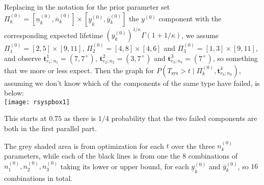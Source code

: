 \documentclass[12pt,a4paper,fleqn]{narms}
\newcommand{\mbf}[1]{\mathbf{#1}}
\newcommand{\uz}{^{(0)}} %
\newcommand{\ul}[1]{\underline{#1}}
\newcommand{\ol}[1]{\overline{#1}}
\def\Tsys{T_\text{sys}}
\def\yz{y\uz}
\def\ykz{y\uz_k}
\def\ykzl{\ul{y}\uz_k}
\def\ykzu{\ol{y}\uz_k}
\def\nkz{n\uz_k}
\newcommand{\nkzfun}[1]{n\uz_{#1}}
\def\nkzl{\ul{n}\uz_k}
\def\nkzu{\ol{n}\uz_k}
\def\PkZ{\Pi\uz_k}
\newcommand{\PZi}[1]{\Pi\uz_{#1}}
\begin{document}

\bigskip

Replacing in the notation for the prior parameter set $\PkZ = [\nkzl,\nkzu] \times [\ykzl,\ykzu]$
the $\yz$ component with the corresponding expected lifetime $(\ykz)^{1/\kappa} \Gamma(1 + 1/\kappa)$,
we assume $\PZi{1} = [2,5] \times [9, 11]$, $\PZi{2} = [4,8] \times [4, 6]$ and $\PZi{3} = [1,3] \times [9, 11]$,
and observe $\mbf{t}^1_{e_1;n_1} = (7, 7^+)$, $\mbf{t}^2_{e_2;n_2} = (3,7^+)$ and $\mbf{t}^3_{e_3;n_3} = (7^+)$,
so something that we more or less expect. Then the graph for $P(\Tsys > t\mid\PkZ, \mbf{t}^k_{e_k;n_k})$,
assuming we don't know which of the components of the same type have failed, is below:\\

\texttt{[image: rsyspbox1]}

This starts at $0.75$ as there is $1/4$ probability that the two failed components
are both in the first parallel part.

The grey shaded area is from optimization for each $t$ over the three $\nkz$ parameters,
while each of the black lines is from one the $8$ combinations of $\nkzfun{1}, \nkzfun{2}, \nkzfun{3}$
taking its lower or upper bound, for each $\ykzl$ and $\ykzu$, so $16$ combinations in total.
\end{document}
